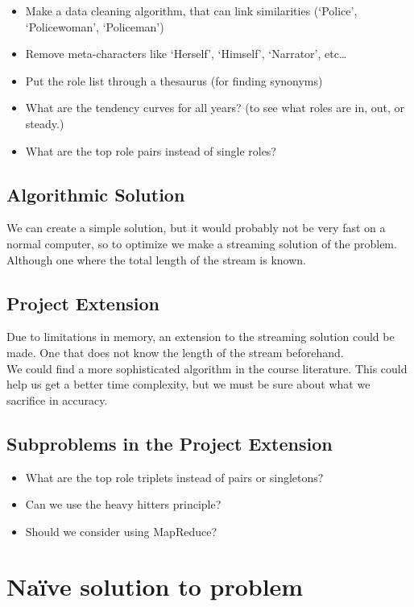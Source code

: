\documentclass[a4paper,11pt]{article}
\begin{document}
\begin{itemize}
    \item Make a data cleaning algorithm, that can link similarities (‘Police’, ‘Policewoman’, ‘Policeman’)
    \item Remove meta-characters like ‘Herself’, ‘Himself’, ‘Narrator’, etc…
    \item Put the role list through a thesaurus (for finding synonyms)
    \item What are the tendency curves for all years? (to see what roles are in, out, or steady.)
    \item What are the top role pairs instead of single roles?
\end{itemize}

\subsection{Algorithmic Solution}
We can create a simple solution, but it would probably not be very fast on a normal computer, so to optimize we make a streaming solution of the problem. Although one where the total length of the stream is known.\\

\subsection{Project Extension}
Due to limitations in memory, an extension to the streaming solution could be made. One that does not know the length of the stream beforehand.\\
We could find a more sophisticated algorithm in the course literature. This could help us get a better time complexity, but we must be sure about what we sacrifice in accuracy.\\

\subsection{Subproblems in the Project Extension}
\begin{itemize}
    \item What are the top role triplets instead of pairs or singletons?
    \item Can we use the heavy hitters principle?
    \item Should we consider using MapReduce?
\end{itemize}


\section{Naïve solution to problem}
\end{document}
